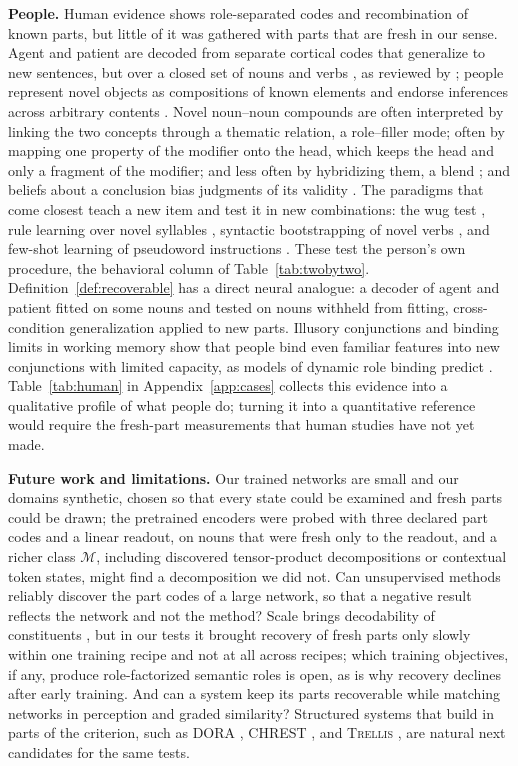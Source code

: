 \documentclass[10pt]{article}
\theoremstyle{plain}
\theoremstyle{remark}
\newcommand{\M}{\mathcal{M}}
\begin{document}
\textbf{People.} Human evidence shows role-separated codes and recombination of known parts, but little of it was gathered with parts that are fresh in our sense. Agent and patient are decoded from separate cortical codes that generalize to new sentences, but over a closed set of nouns and verbs \citep{frankland2015}, as reviewed by \citet{frankland2020}; people represent novel objects as compositions of known elements \citep{schwartenbeck2023} and endorse inferences across arbitrary contents \citep{rips1994}. Novel noun--noun compounds are often interpreted by linking the two concepts through a thematic relation, a role--filler mode; often by mapping one property of the modifier onto the head, which keeps the head and only a fragment of the modifier; and less often by hybridizing them, a blend \citep{wisniewski1997}; and beliefs about a conclusion bias judgments of its validity \citep{evans1983}. The paradigms that come closest teach a new item and test it in new combinations: the wug test \citep{berko1958}, rule learning over novel syllables \citep{marcus1999}, syntactic bootstrapping of novel verbs \citep{gleitman1990,naigles1990}, and few-shot learning of pseudoword instructions \citep{lake2019}. These test the person's own procedure, the behavioral column of Table~\ref{tab:twobytwo}. Definition~\ref{def:recoverable} has a direct neural analogue: a decoder of agent and patient fitted on some nouns and tested on nouns withheld from fitting, cross-condition generalization \citep{bernardi2020} applied to new parts. Illusory conjunctions \citep{treisman1982} and binding limits in working memory \citep{wheeler2002} show that people bind even familiar features into new conjunctions with limited capacity, as models of dynamic role binding predict \citep{hummel1997}. Table~\ref{tab:human} in Appendix~\ref{app:cases} collects this evidence into a qualitative profile of what people do; turning it into a quantitative reference would require the fresh-part measurements that human studies have not yet made.

\textbf{Future work and limitations.} Our trained networks are small and our domains synthetic, chosen so that every state could be examined and fresh parts could be drawn; the pretrained encoders were probed with three declared part codes and a linear readout, on nouns that were fresh only to the readout, and a richer class $\M$, including discovered tensor-product decompositions \citep{soulos2020} or contextual token states, might find a decomposition we did not. Can unsupervised methods reliably discover the part codes of a large network, so that a negative result reflects the network and not the method? Scale brings decodability of constituents \citep{redhardt2025}, but in our tests it brought recovery of fresh parts only slowly within one training recipe and not at all across recipes; which training objectives, if any, produce role-factorized semantic roles is open, as is why recovery declines after early training. And can a system keep its parts recoverable while matching networks in perception and graded similarity? Structured systems that build in parts of the criterion, such as DORA \citep{doumas2022}, CHREST \citep{gobet2000}, and \textsc{Trellis} \citep{singaravadivelan2026}, are natural next candidates for the same tests.
\end{document}

